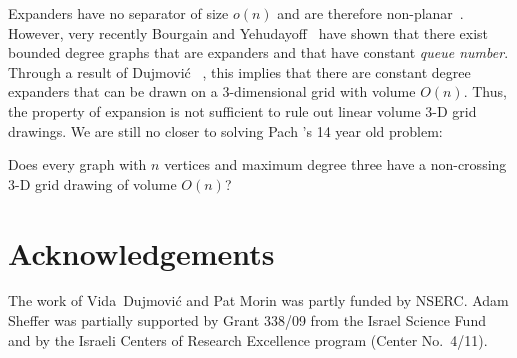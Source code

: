 \documentclass{patmorin}
\begin{document}
Expanders have no separator of size $o(n)$ and are therefore
non-planar~\cite{lipton.tarjan:separator}.  However, very recently
Bourgain and Yehudayoff~\cite{bourgain.yehudayoff:monotone} have
shown that there exist bounded degree graphs that are expanders and
that have constant \emph{queue number}. Through a result of Dujmovi\'c
\etal~\cite[Theorem~8]{dujmovic.por.ea:track}, this implies that there
are constant degree expanders that can be drawn on a 3-dimensional grid
with volume $O(n)$. Thus, the property of expansion is not sufficient
to rule out linear volume 3-D grid drawings.  We are still no closer
to solving Pach \etal's 14 year old problem:

\begin{op}
  Does every graph with $n$ vertices and maximum degree three have a
  non-crossing 3-D grid drawing of volume $O(n)$?
\end{op}


\section*{Acknowledgements}

The work of Vida~Dujmovi\'c and Pat Morin was partly funded by NSERC.
Adam Sheffer was partially supported by Grant 338/09 from the Israel
Science Fund and by the Israeli Centers of Research Excellence program
(Center No.~4/11).



\end{document}
